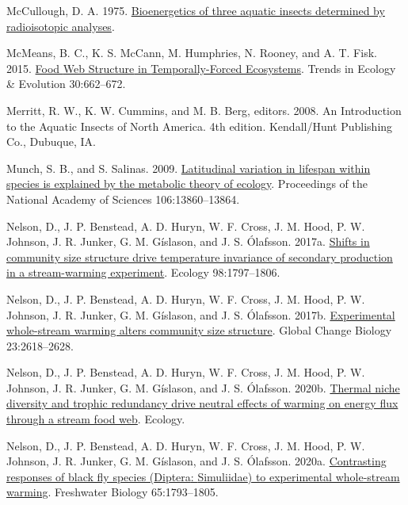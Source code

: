 \documentclass[
]{article}
\newlength{\cslhangindent}
\newlength{\cslentryspacingunit} %
\newenvironment{CSLReferences}[2] %
 {%
  \setlength{\parindent}{0pt}
  \ifodd #1
  \let\oldpar\par
  \def\par{\hangindent=\cslhangindent\oldpar}
  \fi
  \setlength{\parskip}{#2\cslentryspacingunit}
 }%
 {}
\numberwithin{equation}
\begin{document}
\begin{CSLReferences}{1}{0}
\leavevmode{}%
McCullough, D. A. 1975.
\href{https://doi.org/10.2172/7299553}{Bioenergetics of three aquatic
insects determined by radioisotopic analyses}.

\leavevmode{}%
McMeans, B. C., K. S. McCann, M. Humphries, N. Rooney, and A. T. Fisk.
2015. \href{https://doi.org/10.1016/j.tree.2015.09.001}{Food {Web
Structure} in {Temporally-Forced Ecosystems}}. Trends in Ecology \&
Evolution 30:662--672.

\leavevmode{}%
Merritt, R. W., K. W. Cummins, and M. B. Berg, editors. 2008. An
{Introduction} to the {Aquatic Insects} of {North America}. 4th edition.
Kendall/Hunt Publishing Co., Dubuque, IA.

\leavevmode{}%
Munch, S. B., and S. Salinas. 2009.
\href{https://doi.org/10.1073/pnas.0900300106}{Latitudinal variation in
lifespan within species is explained by the metabolic theory of
ecology}. Proceedings of the National Academy of Sciences
106:13860--13864.

\leavevmode{}%
Nelson, D., J. P. Benstead, A. D. Huryn, W. F. Cross, J. M. Hood, P. W.
Johnson, J. R. Junker, G. M. Gíslason, and J. S. Ólafsson. 2017a.
\href{https://doi.org/10.1002/ecy.1857}{Shifts in community size
structure drive temperature invariance of secondary production in a
stream-warming experiment}. Ecology 98:1797--1806.

\leavevmode{}%
Nelson, D., J. P. Benstead, A. D. Huryn, W. F. Cross, J. M. Hood, P. W.
Johnson, J. R. Junker, G. M. Gíslason, and J. S. Ólafsson. 2017b.
\href{https://doi.org/10.1111/gcb.13574}{Experimental whole-stream
warming alters community size structure}. Global Change Biology
23:2618--2628.

\leavevmode{}%
Nelson, D., J. P. Benstead, A. D. Huryn, W. F. Cross, J. M. Hood, P. W.
Johnson, J. R. Junker, G. M. Gíslason, and J. S. Ólafsson. 2020b.
\href{https://doi.org/10.1002/ecy.2952}{Thermal niche diversity and
trophic redundancy drive neutral effects of warming on energy flux
through a stream food web}. Ecology.

\leavevmode{}%
Nelson, D., J. P. Benstead, A. D. Huryn, W. F. Cross, J. M. Hood, P. W.
Johnson, J. R. Junker, G. M. Gíslason, and J. S. Ólafsson. 2020a.
\href{https://doi.org/10.1111/fwb.13583}{Contrasting responses of black
fly species ({Diptera}: {Simuliidae}) to experimental whole-stream
warming}. Freshwater Biology 65:1793--1805.


\end{CSLReferences}
\end{document}
